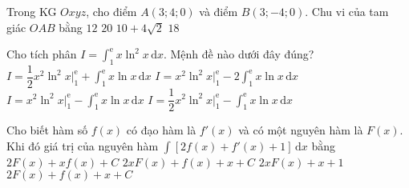 \begin{ex}%
Trong KG $Oxyz$, cho điểm $A(3;4;0)$ và điểm $B(3;-4;0)$. Chu vi của tam giác $OAB$ bằng
\choice
{$12$}
{$20$}
{$10+4\sqrt{2}$}
{\True $18$}
\end{ex}

\begin{ex}%
Cho tích phân $I=\displaystyle\int_1^{\mathrm{e}} x\ln ^2 x \mathrm{\,d}x$. Mệnh đề nào dưới đây đúng?
\choice
{$I=\dfrac{1}{2} x^2\ln ^2 x\bigg|_1^{\mathrm{e}}+\displaystyle\int_1^{\mathrm{e}} x\ln x \mathrm{\,d}x$}
{$I=x^2\ln ^2 x\bigg|_1^{\mathrm{e}}-2\displaystyle\int_1^{\mathrm{e}} x\ln x \mathrm{\,d}x$}
{$I=x^2\ln ^2 x\bigg|_1^{\mathrm{e}}-\displaystyle\int_1^{\mathrm{e}} x\ln x \mathrm{\,d}x$}
{\True $I=\dfrac{1}{2} x^2\ln ^2 x\bigg|_1^{\mathrm{e}}-\displaystyle\int_1^{\mathrm{e}} x\ln x \mathrm{\,d}x$}
\end{ex}

\begin{ex}%
Cho biết hàm số $f(x)$ có đạo hàm là $f'(x)$ và có một nguyên hàm là $F(x)$. Khi đó giá trị của nguyên hàm $\displaystyle\int\left[2 f(x)+f'(x)+1\right]\mathrm{\,d}x$ bằng
\choice
{$2 F(x)+x f(x)+C$}
{$2x F(x)+f(x)+x+C$}
{$2x F(x)+x+1$}
{\True $2 F(x)+f(x)+x+C$}
\end{ex}

